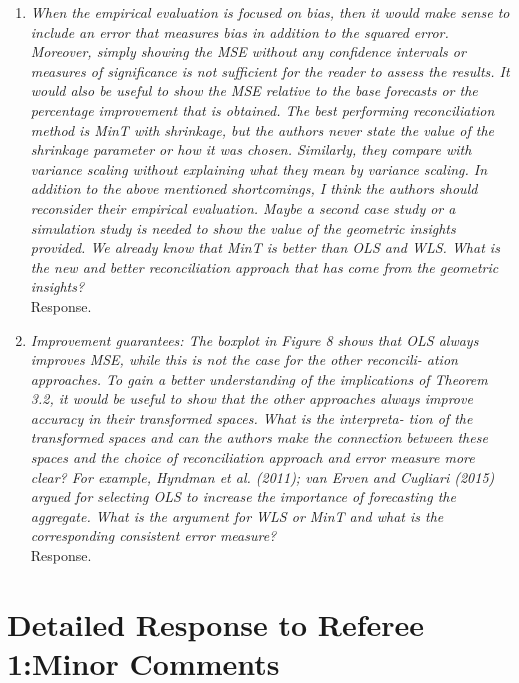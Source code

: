 \documentclass[a4paper,11pt]{article}
\begin{document}
	
	\begin{enumerate}
		
		
		
		\item \textit{When the empirical evaluation is focused on bias, then it would make sense to include an error that measures bias in addition to the squared error. Moreover, simply showing the MSE without any confidence intervals or measures of significance is not sufficient for the reader to assess the results. It would also be useful to show the MSE relative to the base forecasts or	the percentage improvement that is obtained. The best performing reconciliation method is MinT with shrinkage, but the authors never state	the value of the shrinkage parameter or how it was chosen. Similarly, they compare with variance scaling without explaining what they mean by variance scaling. In addition to the above mentioned shortcomings, I think the authors should reconsider their empirical evaluation. Maybe a second case study or a simulation study is needed to show the value of the geometric insights provided. We already know that MinT is better than OLS and WLS. What is the new and better reconciliation approach that has come from the geometric insights?}\\	
		Response.\\
		
		\item \textit{Improvement guarantees: The boxplot in Figure 8 shows that OLS
		always improves MSE, while this is not the case for the other reconcili-
		ation approaches. To gain a better understanding of the implications of
		Theorem 3.2, it would be useful to show that the other approaches always
		improve accuracy in their transformed spaces. What is the interpreta-
		tion of the transformed spaces and can the authors make the connection
		between these spaces and the choice of reconciliation approach and error
		measure more clear? For example, Hyndman et al. (2011); van Erven and
		Cugliari (2015) argued for selecting OLS to increase the importance of
		forecasting the aggregate. What is the argument for WLS or MinT and
		what is the corresponding consistent error measure?}\\
	    Response.\\
	    
	    \end{enumerate}
	    
	    \section*{Detailed Response to Referee 1:Minor Comments}
	    
\end{document}
